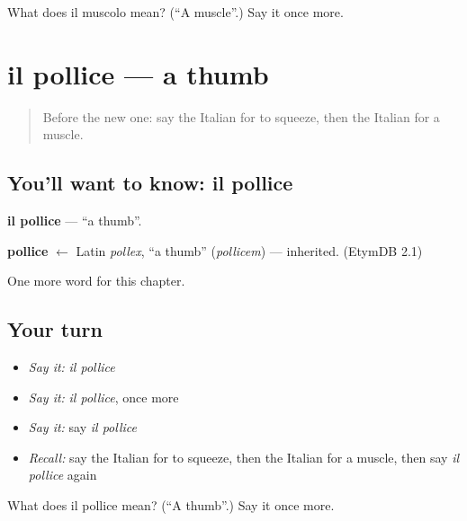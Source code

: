 \begin{tcolorbox}[breakable,colback=teal!4,colframe=teal!35!black,title={Before you move on}]
What does il muscolo mean? (\textquotedblleft{}A muscle\textquotedblright{}.) Say it once more.
\end{tcolorbox}
\section[il pollice]{il pollice — a thumb}

\label{lesson:IT-C185-pollice}



\begin{quote}
Before the new one: say the Italian for to squeeze, then the Italian for a muscle.
\end{quote}

\subsection*{You'll want to know: il pollice}
\textbf{il pollice} — \textquotedblleft{}a thumb\textquotedblright{}.

\begin{cousinweb}
\textbf{pollice} $\leftarrow$ Latin \emph{pollex}, \textquotedblleft{}a thumb\textquotedblright{} (\emph{pollicem}) — inherited. (EtymDB 2.1)
\end{cousinweb}

\begin{grammarlens}[title={What you've built}]
One more word for this chapter.
\end{grammarlens}

\subsection*{Your turn}
\begin{itemize}
\raggedright
  \item \emph{Say it:} \emph{il pollice}
  \item \emph{Say it:} \emph{il pollice}, once more
  \item \emph{Say it:} say \emph{il pollice}
  \item \emph{Recall:} say the Italian for to squeeze, then the Italian for a muscle, then say \emph{il pollice} again
\end{itemize}

\begin{tcolorbox}[breakable,colback=teal!4,colframe=teal!35!black,title={Before you move on}]
What does il pollice mean? (\textquotedblleft{}A thumb\textquotedblright{}.) Say it once more.
\end{tcolorbox}
